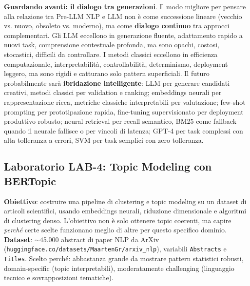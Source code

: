 \documentclass[12pt,a4paper]{article}
\begin{document}
\textbf{Guardando avanti: il dialogo tra generazioni}. Il modo migliore per pensare alla relazione tra Pre-LLM NLP e LLM non \`e come successione lineare (vecchio vs. nuovo, obsoleto vs. moderno), ma come \textbf{dialogo continuo} tra approcci complementari. Gli LLM eccellono in generazione fluente, adattamento rapido a nuovi task, comprensione contestuale profonda, ma sono opachi, costosi, stocastici, difficili da controllare. I metodi classici eccellono in efficienza computazionale, interpretabilit\`a, controllabilit\`a, determinismo, deployment leggero, ma sono rigidi e catturano solo pattern superficiali. Il futuro probabilmente sar\`a \textbf{ibridazione intelligente}: LLM per generare candidati creativi, metodi classici per validation e ranking; embeddings neurali per rappresentazione ricca, metriche classiche interpretabili per valutazione; few-shot prompting per prototipazione rapida, fine-tuning supervisionato per deployment produttivo robusto; neural retrieval per recall semantico, BM25 come fallback quando il neurale fallisce o per vincoli di latenza; GPT-4 per task complessi con alta tolleranza a errori, SVM per task semplici con zero tolleranza.

\subsection{Laboratorio LAB-4: Topic Modeling con BERTopic}

\begin{defbox}
\textbf{Obiettivo}: costruire una pipeline di clustering e topic modeling su un dataset di articoli scientifici, usando embeddings neurali, riduzione dimensionale e algoritmi di clustering denso. L'obiettivo non \`e solo ottenere topic coerenti, ma capire \emph{perch\'e} certe scelte funzionano meglio di altre per questo specifico dominio. \textbf{Dataset}: $\sim$45.000 abstract di paper NLP da ArXiv (\texttt{huggingface.co/datasets/MaartenGr/arxiv\_nlp}), variabili \texttt{Abstracts} e \texttt{Titles}. Scelto perch\'e: abbastanza grande da mostrare pattern statistici robusti, domain-specific (topic interpretabili), moderatamente challenging (linguaggio tecnico e sovrapposizioni tematiche).
\end{defbox}
\end{document}
